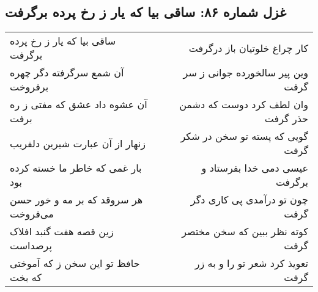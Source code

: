\begin{center}
\section*{غزل شماره ۸۶: ساقی بیا که یار ز رخ پرده برگرفت}
\label{sec:sh086}
\begin{longtable}{l p{0.5cm} r}
ساقی بیا که یار ز رخ پرده برگرفت
&&
کار چراغ خلوتیان باز درگرفت
\\
آن شمع سرگرفته دگر چهره برفروخت
&&
وین پیر سالخورده جوانی ز سر گرفت
\\
آن عشوه داد عشق که مفتی ز ره برفت
&&
وان لطف کرد دوست که دشمن حذر گرفت
\\
زنهار از آن عبارت شیرین دلفریب
&&
گویی که پسته تو سخن در شکر گرفت
\\
بار غمی که خاطر ما خسته کرده بود
&&
عیسی دمی خدا بفرستاد و برگرفت
\\
هر سروقد که بر مه و خور حسن می‌فروخت
&&
چون تو درآمدی پی کاری دگر گرفت
\\
زین قصه هفت گنبد افلاک پرصداست
&&
کوته نظر ببین که سخن مختصر گرفت
\\
حافظ تو این سخن ز که آموختی که بخت
&&
تعویذ کرد شعر تو را و به زر گرفت
\\
\end{longtable}
\end{center}
